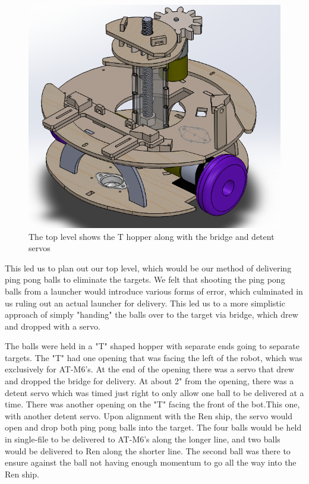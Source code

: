 \documentclass[]{article}
\begin{document}
\begin{figure}[H]
    \centering
    \includegraphics[scale=0.50]{bottom-platform-CAD}
    \caption{The top level shows the T hopper along with the bridge and detent servos}
    \label{no upper platform cad}
\end{figure}

This led us to plan out our top level, which would be our method of delivering ping pong balls to eliminate the targets. We felt that shooting the ping pong balls from a launcher would introduce various forms of error, which culminated in us ruling out an actual launcher for delivery. This led us to a more simplistic approach of simply "handing" the balls over to the target via bridge, which drew and dropped with a servo.

The balls were held in a "T" shaped hopper with separate ends going to separate targets. The "T" had one opening that was facing the left of the robot, which was exclusively for AT-M6's. At the end of the opening there was a servo that drew and dropped the bridge for delivery. At about 2" from the opening, there was a detent servo which was timed just right to only allow one ball to be delivered at a time. There was another opening on the "T" facing the front of the bot.This one, with another detent servo. Upon alignment with the Ren ship, the servo would open and drop both ping pong balls into the target. The four balls would be held in single-file to be delivered to AT-M6's along the longer line, and two balls would be delivered to Ren along the shorter line. The second ball was there to ensure against the ball not having enough momentum to go all the way into the Ren ship.
\end{document}
